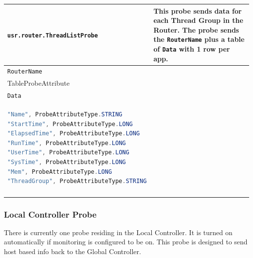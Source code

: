 {\begin{longtable}{ | p{5.7cm} | p{8.7cm} | }
\\
\hline
\texttt{usr.router.ThreadListProbe} & This probe sends data for
each Thread Group in the Router.  \newline
The probe sends the \texttt{RouterName} plus
a table of \texttt{Data} with 1 row per app.


\vspace{\baselineskip}
\begin{tabular}{ p{8.3cm} }
  \hline
  ProbeAttributeType.STRING \\
  \hline
  \texttt{RouterName} \\
  \hline
  TableProbeAttribute \\
  \hline
  \texttt{Data} \\
  \hline
\begin{lstlisting}[language=java]
"Name", ProbeAttributeType.STRING
"StartTime", ProbeAttributeType.LONG
"ElapsedTime", ProbeAttributeType.LONG
"RunTime", ProbeAttributeType.LONG
"UserTime", ProbeAttributeType.LONG
"SysTime", ProbeAttributeType.LONG
"Mem", ProbeAttributeType.LONG
"ThreadGroup", ProbeAttributeType.STRING
\end{lstlisting} \\
\hline
\end{tabular}

\\
\hline
\end{longtable}


\normalsize
}


\subsubsection*{Local Controller Probe}

There is currently one probe residing in the Local Controller.
It is turned on automatically if monitoring is configured to be on.
This probe is designed to send host based info back to the Global
Controller. 



